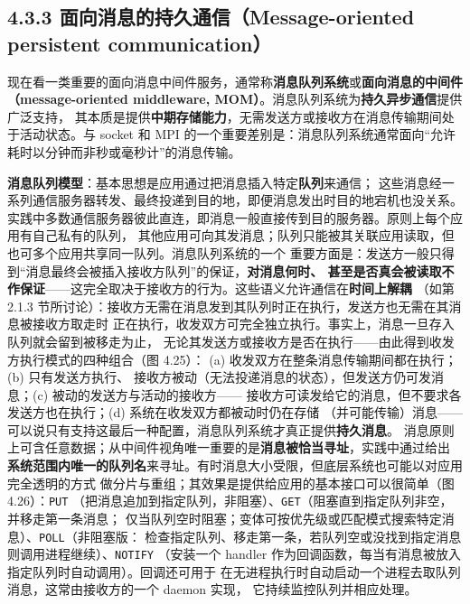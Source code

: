 \begin{closeread}
\end{closeread}


\subsection*{4.3.3 面向消息的持久通信（Message-oriented persistent communication）}
现在看一类重要的面向消息中间件服务，通常称\textbf{消息队列系统}或\textbf{面向消息的中间件
（message-oriented middleware, MOM）}。消息队列系统为\textbf{持久异步通信}提供广泛支持，
其本质是提供\textbf{中期存储能力}，无需发送方或接收方在消息传输期间处于活动状态。与 socket
和 MPI 的一个重要差别是：消息队列系统通常面向“允许耗时以分钟而非秒或毫秒计”的消息传输。

\medskip\noindent\textbf{消息队列模型}：基本思想是应用通过把消息插入特定\textbf{队列}来通信；
这些消息经一系列通信服务器转发、最终投递到目的地，即便消息发出时目的地宕机也没关系。
实践中多数通信服务器彼此直连，即消息一般直接传到目的服务器。原则上每个应用有自己私有的队列，
其他应用可向其发消息；队列只能被其关联应用读取，但也可多个应用共享同一队列。消息队列系统的一个
重要方面是：发送方一般只得到“消息最终会被插入接收方队列”的保证，\textbf{对消息何时、
甚至是否真会被读取不作保证}——这完全取决于接收方的行为。这些语义允许通信在\textbf{时间上解耦}
（如第 2.1.3 节所讨论）：接收方无需在消息发到其队列时正在执行，发送方也无需在其消息被接收方取走时
正在执行，收发双方可完全独立执行。事实上，消息一旦存入队列就会留到被移走为止，
无论其发送方或接收方是否在执行——由此得到收发方执行模式的四种组合（图 4.25）：
(a) 收发双方在整条消息传输期间都在执行；(b) 只有发送方执行、
接收方被动（无法投递消息的状态），但发送方仍可发消息；(c) 被动的发送方与活动的接收方——
接收方可读发给它的消息，但不要求各发送方也在执行；(d) 系统在收发双方都被动时仍在存储
（并可能传输）消息——可以说只有支持这最后一种配置，消息队列系统才真正提供\textbf{持久消息}。
消息原则上可含任意数据；从中间件视角唯一重要的是\textbf{消息被恰当寻址}，实践中通过给出
\textbf{系统范围内唯一的队列名}来寻址。有时消息大小受限，但底层系统也可能以对应用完全透明的方式
做分片与重组；其效果是提供给应用的基本接口可以很简单（图 4.26）：\texttt{PUT}
（把消息追加到指定队列，非阻塞）、\texttt{GET}（阻塞直到指定队列非空，并移走第一条消息；
仅当队列空时阻塞；变体可按优先级或匹配模式搜索特定消息）、\texttt{POLL}（非阻塞版：
检查指定队列、移走第一条，若队列空或没找到指定消息则调用进程继续）、\texttt{NOTIFY}
（安装一个 handler 作为回调函数，每当有消息被放入指定队列时自动调用）。回调还可用于
在无进程执行时自动启动一个进程去取队列消息，这常由接收方的一个 daemon 实现，
它持续监控队列并相应处理。

